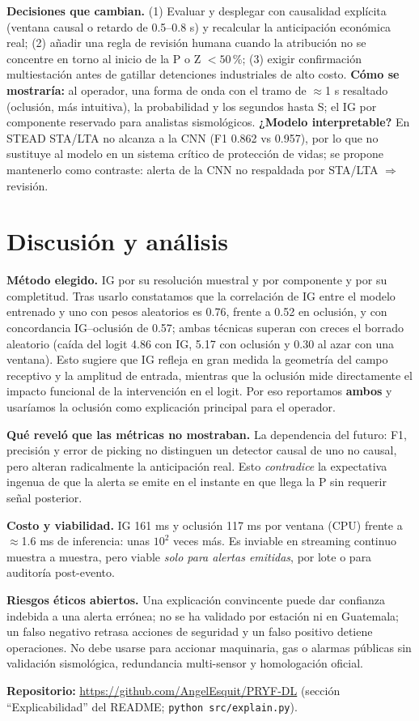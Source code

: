 \documentclass[10pt,letterpaper]{article}
\newcommand{\vIGOcc}{0.57}            %
\newcommand{\vIGRand}{0.76}           %
\newcommand{\vOccRand}{0.52}          %
\newcommand{\vDelIG}{4.86}\newcommand{\vDelOcc}{5.17}\newcommand{\vDelRnd}{0.30}
\newcommand{\vCostIG}{161 ms}\newcommand{\vCostOcc}{117 ms}
\begin{document}
\textbf{Decisiones que cambian.} (1) Evaluar y desplegar con causalidad explícita (ventana causal o retardo de 0.5--0.8 s) y recalcular la anticipación económica real; (2) añadir una regla de revisión humana cuando la atribución no se concentre en torno al inicio de la P o Z $<50$\,\%; (3) exigir confirmación multiestación antes de gatillar detenciones industriales de alto costo.
\textbf{Cómo se mostraría:} al operador, una forma de onda con el tramo de $\approx$1 s resaltado (oclusión, más intuitiva), la probabilidad y los segundos hasta S; el IG por componente reservado para analistas sismológicos.
\textbf{¿Modelo interpretable?} En STEAD STA/LTA no alcanza a la CNN (F1 0.862 vs 0.957), por lo que no sustituye al modelo en un sistema crítico de protección de vidas; se propone mantenerlo como contraste: alerta de la CNN no respaldada por STA/LTA $\Rightarrow$ revisión.

\section{Discusión y análisis}\label{sec:disc}
\textbf{Método elegido.} IG por su resolución muestral y por componente y por su completitud. Tras usarlo constatamos que la correlación de IG entre el modelo entrenado y uno con pesos aleatorios es \vIGRand{}, frente a \vOccRand{} en oclusión, y con concordancia IG--oclusión de \vIGOcc{}; ambas técnicas superan con creces el borrado aleatorio (caída del logit \vDelIG{} con IG, \vDelOcc{} con oclusión y \vDelRnd{} al azar con una ventana). Esto sugiere que IG refleja en gran medida la geometría del campo receptivo y la amplitud de entrada, mientras que la oclusión mide directamente el impacto funcional de la intervención en el logit. Por eso reportamos \textbf{ambos} y usaríamos la oclusión como explicación principal para el operador.

\textbf{Qué reveló que las métricas no mostraban.} La dependencia del futuro: F1, precisión y error de picking no distinguen un detector causal de uno no causal, pero alteran radicalmente la anticipación real. Esto \emph{contradice} la expectativa ingenua de que la alerta se emite en el instante en que llega la P sin requerir señal posterior.

\textbf{Costo y viabilidad.} IG \vCostIG{} y oclusión \vCostOcc{} por ventana (CPU) frente a $\approx$1.6 ms de inferencia: unas $10^2$ veces más. Es inviable en streaming continuo muestra a muestra, pero viable \emph{solo para alertas emitidas}, por lote o para auditoría post-evento.

\textbf{Riesgos éticos abiertos.} Una explicación convincente puede dar confianza indebida a una alerta errónea; no se ha validado por estación ni en Guatemala; un falso negativo retrasa acciones de seguridad y un falso positivo detiene operaciones. No debe usarse para accionar maquinaria, gas o alarmas públicas sin validación sismológica, redundancia multi-sensor y homologación oficial.

\par\vspace{2pt}
\noindent\parbox{\textwidth}{\textbf{Repositorio:} \url{https://github.com/AngelEsquit/PRYF-DL} (sección ``Explicabilidad'' del README; \texttt{python src/explain.py}).}
\end{document}
